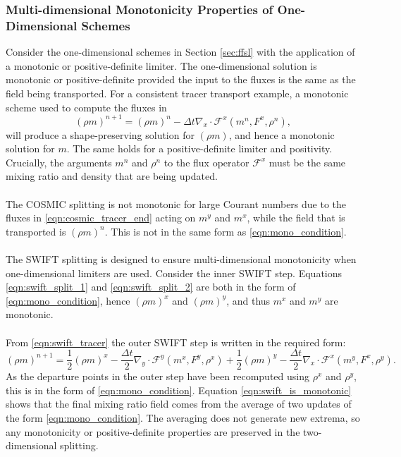 \documentclass{ametsocV6.1}
\begin{document}
\subsubsection{Multi-dimensional Monotonicity Properties of One-Dimensional Schemes}
Consider the one-dimensional schemes in Section \ref{sec:ffsl} with the application of a monotonic or positive-definite limiter. The one-dimensional solution is monotonic or positive-definite provided the input to the fluxes is the same as the field being transported. For a consistent tracer transport example, a monotonic scheme used to compute the fluxes in
\begin{equation} \label{eqn:mono_condition}
    (\rho m)^{n+1} = (\rho m)^n - \Delta{t} \nabla_x\cdot \mathcal{F}^x(m^n, F^x, \rho^n), 
\end{equation}
will produce a shape-preserving solution for $(\rho m)$, and hence a monotonic solution for $m$. The same holds for a positive-definite limiter and positivity.
Crucially, the arguments $m^n$ and $\rho^n$ to the flux operator $\mathcal{F}^x$ must be the same mixing ratio and density that are being updated. \\
\\
The COSMIC splitting is not monotonic for large Courant numbers due to the fluxes in \eqref{eqn:cosmic_tracer_end} acting on $m^y$ and $m^x$, while the field that is transported is $(\rho m)^n$. This is not in the same form as \eqref{eqn:mono_condition}. \\ 
\\
The SWIFT splitting is designed to ensure multi-dimensional monotonicity when one-dimensional limiters are used. Consider the inner SWIFT step. Equations \eqref{eqn:swift_split_1} and \eqref{eqn:swift_split_2} are both in the form of \eqref{eqn:mono_condition}, hence $(\rho m)^x$ and $(\rho m)^y$, and thus $m^x$ and $m^y$ are monotonic. \\
\\
From \eqref{eqn:swift_tracer} the outer SWIFT step is written in the required form:
\begin{equation}
    (\rho m)^{n+1}  = \frac{1}{2}(\rho m)^x  -\frac{\Delta{t}}{2}\nabla_y\cdot \mathcal{F}^y(m^x,F^{y},\rho^x) +  \frac{1}{2}(\rho m)^y - \frac{\Delta{t}}{2}\nabla_x\cdot \mathcal{F}^x(m^y,F^{x},\rho^y). \label{eqn:swift_is_monotonic}
\end{equation}
As the departure points in the outer step have been recomputed using $\rho^x$ and $\rho^y$, this is in the form of \eqref{eqn:mono_condition}.
Equation \eqref{eqn:swift_is_monotonic} shows that the final mixing ratio field comes from the average of two updates of the form \eqref{eqn:mono_condition}.
The averaging does not generate new extrema, so any monotonicity or positive-definite properties are preserved in the two-dimensional splitting.
\end{document}
